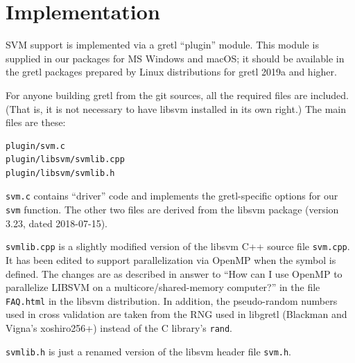 \documentclass{article}
\begin{document}
\section{Implementation}
\label{sec:implement}

SVM support is implemented via a gretl ``plugin'' module. This module
is supplied in our packages for MS Windows and macOS; it should be
available in the gretl packages prepared by Linux distributions for
gretl 2019a and higher.

For anyone building gretl from the git sources, all the required files
are included. (That is, it is not necessary to have \textsf{libsvm}
installed in its own right.)  The main files are these:
\begin{verbatim}
plugin/svm.c
plugin/libsvm/svmlib.cpp
plugin/libsvm/svmlib.h
\end{verbatim}

\texttt{svm.c} contains ``driver'' code and implements the
gretl-specific options for our \texttt{svm} function. The other two
files are derived from the \textsf{libsvm} package (version 3.23,
dated 2018-07-15).

\texttt{svmlib.cpp} is a slightly modified version of the
\textsf{libsvm} C++ source file \texttt{svm.cpp}. It has been edited to
support parallelization via \textsf{OpenMP} when the symbol
 is defined. The changes are as described in answer to
``How can I use OpenMP to parallelize LIBSVM on a
multicore/shared-memory computer?'' in the file \texttt{FAQ.html} in the
\textsf{libsvm} distribution. In addition, the pseudo-random numbers
used in cross validation are taken from the RNG used in libgretl
(Blackman and Vigna's \textsf{xoshiro256+}) instead of the C library's
\texttt{rand}.

\texttt{svmlib.h} is just a renamed version of the \textsf{libsvm}
header file \texttt{svm.h}.



\end{document}
